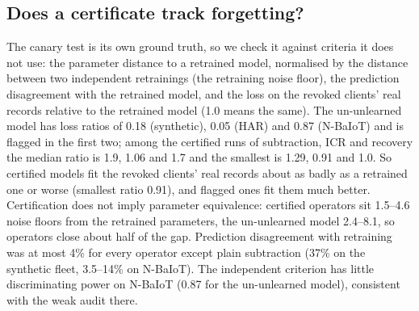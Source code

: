 \documentclass[journal]{IEEEtran}
\begin{document}
\subsection{Does a certificate track forgetting?}
The canary test is its own ground truth, so we check it against criteria it does not use: the parameter distance to a retrained model, normalised by the distance between two independent retrainings (the retraining noise floor), the prediction disagreement with the retrained model, and the loss on the revoked clients' real records relative to the retrained model (1.0 means the same). The un-unlearned model has loss ratios of 0.18 (synthetic), 0.05 (HAR) and 0.87 (N-BaIoT) and is flagged in the first two; among the certified runs of subtraction, ICR and recovery the median ratio is 1.9, 1.06 and 1.7 and the smallest is 1.29, 0.91 and 1.0. So certified models fit the revoked clients' real records about as badly as a retrained one or worse (smallest ratio 0.91), and flagged ones fit them much better. Certification does not imply parameter equivalence: certified operators sit 1.5--4.6 noise floors from the retrained parameters, the un-unlearned model 2.4--8.1, so operators close about half of the gap. Prediction disagreement with retraining was at most 4\% for every operator except plain subtraction (37\% on the synthetic fleet, 3.5--14\% on N-BaIoT). The independent criterion has little discriminating power on N-BaIoT (0.87 for the un-unlearned model), consistent with the weak audit there.
\end{document}
